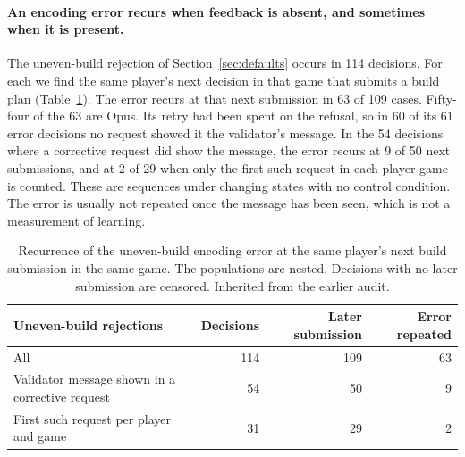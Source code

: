 \paragraph{An encoding error recurs when feedback is absent, and sometimes when it is present.} The uneven-build rejection of Section~\ref{sec:defaults} occurs in 114 decisions. For each we find the same player's next decision in that game that submits a build plan (Table~\ref{tab:recurrence}). The error recurs at that next submission in 63 of 109 cases. Fifty-four of the 63 are Opus. Its retry had been spent on the refusal, so in 60 of its 61 error decisions no request showed it the validator's message. In the 54 decisions where a corrective request did show the message, the error recurs at 9 of 50 next submissions, and at 2 of 29 when only the first such request in each player-game is counted. These are sequences under changing states with no control condition. The error is usually not repeated once the message has been seen, which is not a measurement of learning.

\begin{table}[t]
\centering\small
\begin{tabular}{lrrr}
\toprule
Uneven-build rejections & Decisions & Later submission & Error repeated\\
\midrule
All & 114 & 109 & 63\\
Validator message shown in a corrective request & 54 & 50 & 9\\
First such request per player and game & 31 & 29 & 2\\
\bottomrule
\end{tabular}
\caption{Recurrence of the uneven-build encoding error at the same player's next build submission in the same game. The populations are nested. Decisions with no later submission are censored. Inherited from the earlier audit.}
\label{tab:recurrence}
\end{table}
